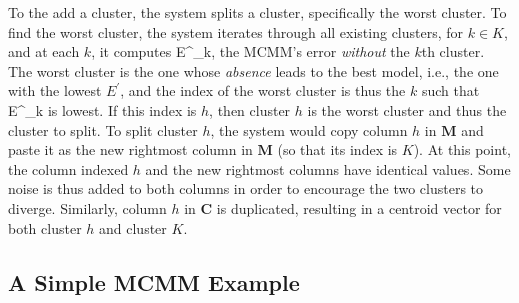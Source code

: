 {To the add a cluster, the system splits a cluster, specifically the worst cluster. To find the worst cluster, 
 the system iterates through all existing clusters, for $k \in K$, and at each $k$, 
it computes E^{\prime}_{k}, the MCMM's error \emph{without} the 
 $k$th cluster.  The worst cluster is the one whose \emph{absence} leads to the best model, 
 i.e., the one with the lowest $E^{\prime}$, and the index of the worst cluster is thus the 
 $k$ such that E^{\prime}_{k} is lowest. If this index is $h$, then cluster $h$ is the 
 worst cluster and thus the cluster to split. To split cluster $h$, 
 the system would copy column $h$ in $\textbf{M}$ and paste it as the new 
 rightmost column in $\textbf{M}$ (so that its index is $K$).  At this point, 
 the column indexed $h$ and the new rightmost columns have identical values.  
 Some noise is thus added to both columns in order to encourage the two clusters to diverge. 
 Similarly, column $h$ in $\textbf{C}$ is duplicated, resulting in a centroid vector 
 for both cluster $h$ and cluster $K$.
 
  

\subsection{A Simple MCMM Example}
\label{subsec:example}

}
